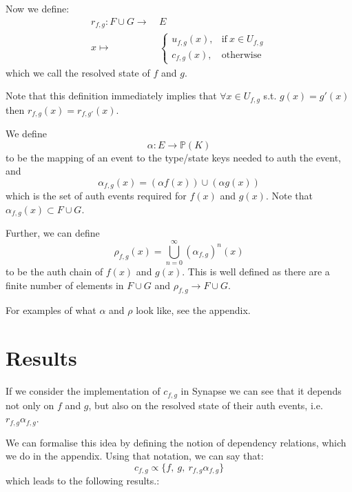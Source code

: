 \documentclass{article}
\begin{document}
Now we define:
\begin{equation} 
\begin{split}
r_{f,g}: F \cup G \longrightarrow &\ E\\
x \longmapsto &\ \begin{cases}
u_{f,g}(x), & \text{if}\ x \in U_{f,g}\\
c_{f,g}(x), & \text{otherwise}
\end{cases} 
\end{split}
\end{equation} which we call the resolved state of $f$ and $g$. 

Note that this definition immediately implies that $\forall x \in U_{f,g}$ s.t. $g(x) = g'(x)$ then $r_{f,g}(x) = r_{f,g'}(x)$.

We define 
\begin{equation}
\alpha: E \rightarrow \mathbb{P}(K)
\end{equation} to be the mapping of an event to the type/state keys needed to auth the event, and
\begin{equation}
\alpha_{f,g}(x) = (\alpha f(x)) \cup (\alpha g(x))
\end{equation} which is the set of auth events required for $f(x)$ and $g(x)$. Note that $\alpha_{f,g}(x) \subset F \cup G$.

Further, we can define
\begin{equation}
\rho_{f,g}(x) = \bigcup_{n=0}^\infty (\alpha_{f,g})^n(x)
\end{equation} to be the auth chain of $f(x)$ and $g(x)$. This is well defined as there are a finite number of elements in $F \cup G$ and $\rho_{f,g} \rightarrow F \cup G$.

For examples of what $\alpha$ and $\rho$ look like, see the appendix.

\newpage
\section{Results}

If we consider the implementation of $c_{f,g}$ in Synapse we can see that it depends not only on $f$ and $g$, but also on the resolved state of their auth events, i.e. $r_{f,g}\alpha_{f,g}$.

We can formalise this idea by defining the notion of dependency relations, which we do in the appendix. Using that notation, we can say that:
\[
c_{f,g} \propto \{f,\ g,\ r_{f,g}\alpha_{f,g}\}
\]
which leads to the following results.:
\end{document}
